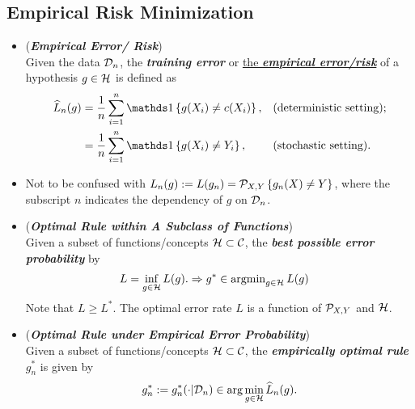 \documentclass[11pt]{article}
\begin{document}
\subsection{Empirical Risk Minimization}
\begin{itemize}
\item  \begin{definition} (\emph{\textbf{Empirical Error/ Risk}}) \\
Given the data ${\mathcal D}_n$, the \emph{\textbf{training error}} or \underline{the \emph{\textbf{empirical error/risk}}} of a hypothesis $g\in {\mathcal H}$ is defined as 
\begin{align*}
 \widehat{L}_{n}(g) &=\frac{1}{n} \sum_{i=1}^{n}\ind{g(X_i)\neq c(X_i)}, &&  (\text{deterministic setting});\\
&= \frac{1}{n}\sum_{i=1}^{n}\ind{g(X_i)\neq Y_i}, &&  (\text{stochastic setting}). %
\end{align*} %
\end{definition}

\item \begin{remark}
Not to be confused with $L_n(g) := L(g_n) = {\mathcal P}_{X,Y}\left\{g_n(X)\neq Y\right\}$, where the subscript $n$ indicates  the dependency of $g$ on ${\mathcal D}_n$.
\end{remark}

\item \begin{remark} (\emph{\textbf{Optimal Rule within A Subclass of Functions}})\\
Given a subset of functions/concepts ${\mathcal H} \subset {\mathcal C}$, the \emph{\textbf{best possible error probability}} by
\begin{align*}
L &= \inf_{g \in {\mathcal H}}L(g). \Rightarrow g^{*} \in \operatorname{argmin}_{g\in {\mathcal H}}L(g)
\end{align*} Note that $L \ge L^{*}$. The optimal error rate $L$ is a function of ${\mathcal P}_{X,Y}$ and ${\mathcal H}$.
\end{remark}

\item \begin{remark} (\emph{\textbf{Optimal Rule under Empirical Error Probability}})\\
Given a subset of functions/concepts ${\mathcal H} \subset {\mathcal C}$, the \emph{\textbf{empirically optimal rule}} $g_{n}^{*}$ is given by 
\begin{align*}
g_n^{*} := g_n^{*}(\cdot| {\mathcal D}_n) \in \arg\min_{g\in {\mathcal H}} \widehat{L}_{n}(g) .
\end{align*} 
\end{remark}


\end{itemize}
\end{document}
